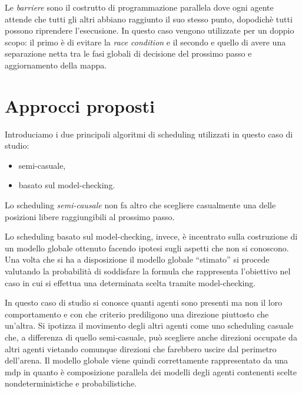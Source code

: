 Le \emph{barriere} sono il costrutto di programmazione parallela dove ogni agente attende che tutti gli altri abbiano raggiunto il suo stesso punto, dopodichè tutti possono riprendere l'esecusione. In questo caso vengono utilizzate per un doppio scopo: il primo è di evitare la \emph{race condition} e il secondo e quello di avere una separazione netta tra le fasi globali di decisione del prossimo passo e aggiornamento della mappa.

\section{Approcci proposti}
Introduciamo i due principali algoritmi di scheduling utilizzati in questo caso di studio:
\begin{itemize}
	\item semi-casuale,
	\item basato sul model-checking.
\end{itemize}
Lo scheduling \emph{semi-causale} non fa altro che scegliere casualmente una delle posizioni libere raggiungibili al prossimo passo.

Lo scheduling basato sul model-checking, invece, è incentrato sulla costruzione di un modello globale ottenuto facendo ipotesi sugli aspetti che non si conoscono. Una volta che si ha a disposizione il modello globale ``stimato'' si procede valutando la probabilità di soddisfare la formula che rappresenta l'obiettivo nel caso in cui si effettua una determinata scelta tramite model-checking.

In questo caso di studio si conosce quanti agenti sono presenti ma non il loro comportamento e con che criterio prediligono una direzione piuttosto che un'altra. Si ipotizza il movimento degli altri agenti come uno scheduling casuale che, a differenza di quello semi-casuale, può scegliere anche direzioni occupate da altri agenti vietando comunque direzioni che farebbero uscire dal perimetro dell'arena. Il modello globale viene quindi correttamente rappresentato da una \ac{mdp} in quanto è composizione parallela dei modelli degli agenti contenenti scelte nondeterministiche e probabilistiche.

